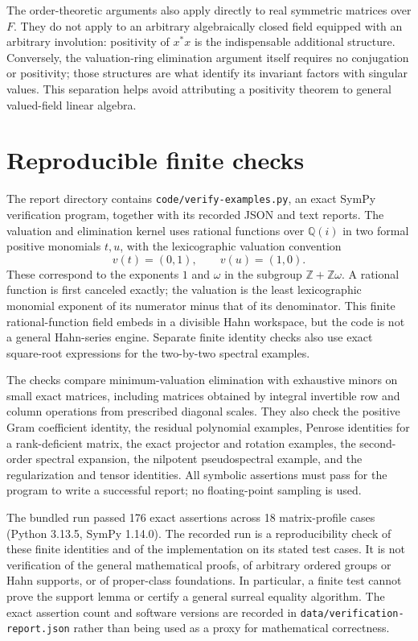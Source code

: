 \documentclass[11pt,a4paper]{article}
\numberwithin{equation}{section}
\theoremstyle{definition}
\theoremstyle{remark}
\newcommand{\Q}{\mathbb Q}
\newcommand{\Z}{\mathbb Z}
\begin{document}
The order-theoretic arguments also apply directly to real symmetric
matrices over $F$. They do not apply to an arbitrary algebraically closed
field equipped with an arbitrary involution: positivity of $x^*x$ is the
indispensable additional structure. Conversely, the valuation-ring
elimination argument itself requires no conjugation or positivity; those
structures are what identify its invariant factors with singular values.
This separation helps avoid attributing a positivity theorem to general
valued-field linear algebra.

\section{Reproducible finite checks}\label{app:checks}

The report directory contains \texttt{code/verify-examples.py}, an exact SymPy
verification program, together with its recorded JSON and text reports.
The valuation and elimination kernel uses rational functions over $\Q(i)$
in two formal positive monomials
$t,u$, with the lexicographic valuation convention
\[
 v(t)=(0,1),\qquad v(u)=(1,0).
\]
These correspond to the exponents $1$ and $\omega$ in the subgroup
$\Z+\Z\omega$. A rational function is first canceled exactly; the
valuation is the least lexicographic monomial exponent of its numerator
minus that of its denominator. This finite rational-function field embeds
in a divisible Hahn workspace, but the code is not a general Hahn-series
engine. Separate finite identity checks also use exact square-root
expressions for the two-by-two spectral examples.

The checks compare minimum-valuation elimination with exhaustive minors on
small exact matrices, including matrices obtained by integral invertible
row and column operations from prescribed diagonal scales. They also check
the positive Gram coefficient identity, the residual polynomial examples,
Penrose identities for a rank-deficient matrix, the exact projector and
rotation examples, the second-order spectral expansion, the nilpotent
pseudospectral example, and the regularization and tensor identities.
All symbolic assertions must pass for the program to write a successful
report; no floating-point sampling is used.

The bundled run passed 176 exact assertions across 18 matrix-profile cases
(Python 3.13.5, SymPy 1.14.0). The recorded run is a reproducibility check of these finite identities and
of the implementation on its stated test cases. It is not verification of
the general mathematical proofs, of arbitrary ordered groups or Hahn
supports, or of proper-class foundations. In particular, a finite test
cannot prove the support lemma or certify a general surreal equality
algorithm. The exact assertion count and software versions are recorded in
\texttt{data/verification-report.json} rather than being used as a proxy
for mathematical correctness.
\end{document}

